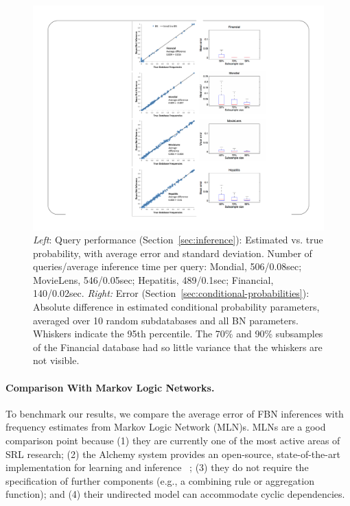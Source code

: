 \documentclass[oribibl]{llncs}
\begin{document}
\begin{figure}[hptb]
\begin{center}
\includegraphics{figures/inf-charts-vertical.pdf}
\end{center}
\caption{{\em Left}: Query performance (Section~\ref{sec:inference}): Estimated vs. true probability, with average error and standard deviation. Number of queries/average inference time per query: Mondial, 506/0.08sec; MovieLens, 546/0.05sec; Hepatitis, 489/0.1sec; Financial, 140/0.02sec. 
{\em Right:} Error (Section~\ref{sec:conditional-probabilities}): Absolute difference in estimated conditional probability parameters, averaged over 10 random subdatabases and all BN parameters. 
%
Whiskers indicate the 95th percentile.
The 70\% and 90\% subsamples of the Financial database had so little variance that the whiskers are not visible. \label{fig:results}}
\end{figure}


\paragraph{Comparison With Markov Logic Networks.}

To benchmark our results, we compare the average error of FBN inferences with frequency estimates from Markov Logic Network (MLN)s. MLNs are a
good comparison point because (1) they are currently one of the most active areas of SRL research;  (2)  the Alchemy system provides an open-source, state-of-the-art implementation for learning and inference~ \cite{Kok2009a}; (3) they do not require the specification of further components (e.g., a combining rule or aggregation function); and (4) their undirected model can accommodate cyclic dependencies.
\end{document}
